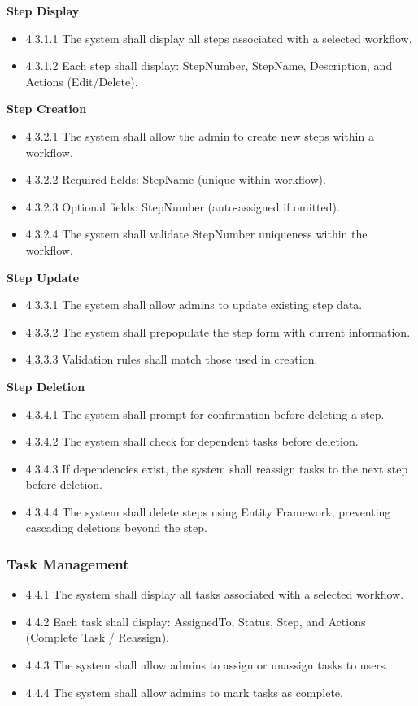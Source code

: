 \documentclass[12pt]{article}
\begin{document}
\textbf{Step Display}
\begin{itemize}
    \item 4.3.1.1 The system shall display all steps associated with a selected workflow.
    \item 4.3.1.2 Each step shall display: StepNumber, StepName, Description, and Actions
    (Edit/Delete).
\end{itemize}

\textbf{Step Creation}
\begin{itemize}
    \item 4.3.2.1 The system shall allow the admin to create new steps within a workflow.
    \item 4.3.2.2 Required fields: StepName (unique within workflow).
    \item 4.3.2.3 Optional fields: StepNumber (auto-assigned if omitted).
    \item 4.3.2.4 The system shall validate StepNumber uniqueness within the workflow.
\end{itemize}

\textbf{Step Update}
\begin{itemize}
    \item 4.3.3.1 The system shall allow admins to update existing step data.
    \item 4.3.3.2 The system shall prepopulate the step form with current information.
    \item 4.3.3.3 Validation rules shall match those used in creation.
\end{itemize}

\textbf{Step Deletion}
\begin{itemize}
    \item 4.3.4.1 The system shall prompt for confirmation before deleting a step.
    \item 4.3.4.2 The system shall check for dependent tasks before deletion.
    \item 4.3.4.3 If dependencies exist, the system shall reassign tasks to the next step
    before deletion.
    \item 4.3.4.4 The system shall delete steps using Entity Framework, preventing cascading
    deletions beyond the step.
\end{itemize}

\subsubsection{Task Management}
\begin{itemize}
    \item 4.4.1 The system shall display all tasks associated with a selected workflow.
    \item 4.4.2 Each task shall display: AssignedTo, Status, Step, and Actions (Complete Task
    / Reassign).
    \item 4.4.3 The system shall allow admins to assign or unassign tasks to users.
    \item 4.4.4 The system shall allow admins to mark tasks as complete.
\end{itemize}
\end{document}

